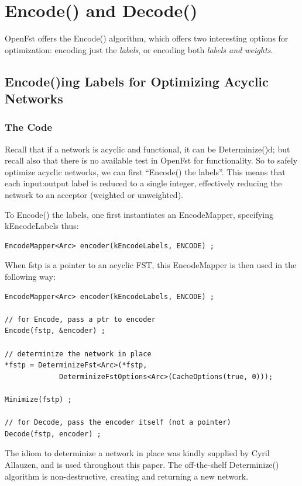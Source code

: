 \documentclass[letterpaper,12pt]{article}
\begin{document}
\section{Encode() and Decode()}

OpenFst offers the Encode() algorithm, which offers two interesting options for
optimization: encoding just the \emph{labels}, or encoding both \emph{labels and weights}. 

\subsection{Encode()ing Labels for Optimizing Acyclic Networks}

\subsubsection{The Code}

Recall that if a network is acyclic and functional, it can be Determinize()d; but
recall also that there is no available test in OpenFst for functionality.  So to
safely optimize acyclic networks, we can first ``Encode() the labels''.  This means
that each input:output label is reduced to a single integer, effectively reducing
the network to an acceptor (weighted or unweighted).  

To Encode() the labels, one first instantiates an EncodeMapper, specifying
kEncodeLabels thus:

\begin{Verbatim}[fontsize=\footnotesize]
EncodeMapper<Arc> encoder(kEncodeLabels, ENCODE) ;
\end{Verbatim}

\noindent
When fstp is a pointer to an acyclic FST, this EncodeMapper is then used in the following way:


\begin{Verbatim}[fontsize=\footnotesize]
EncodeMapper<Arc> encoder(kEncodeLabels, ENCODE) ;

// for Encode, pass a ptr to encoder
Encode(fstp, &encoder) ;

// determinize the network in place
*fstp = DeterminizeFst<Arc>(*fstp, 
             DeterminizeFstOptions<Arc>(CacheOptions(true, 0)));

Minimize(fstp) ;

// for Decode, pass the encoder itself (not a pointer)
Decode(fstp, encoder) ;
\end{Verbatim}

The idiom to determinize a network in place was kindly supplied by
Cyril Allauzen, and is used throughout this paper.  The
off-the-shelf Determinize() algorithm is non-destructive, creating
and returning a new network.
\end{document}
